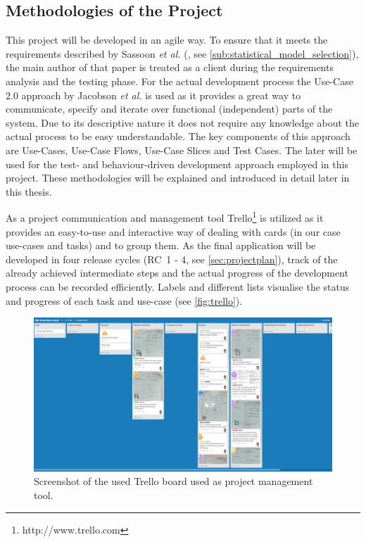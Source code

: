 \subsection{Methodologies of the Project}
\label{sub:methodologies}
This project will be developed in an agile way. To ensure that it meets the requirements described by Sassoon \textit{et al.} (\cite{sassoon2014}, see \autoref{sub:statistical_model_selection}), the main author of that paper is treated as a client during the requirements analysis and the testing phase. For the actual development process the Use-Case 2.0 approach by Jacobson \textit{et al.} \cite{jacobson2011usecase} is used as it provides a great way to communicate, specify and iterate over functional (independent) parts of the system. Due to its descriptive nature it does not require any knowledge about the actual process to be easy understandable. The key components of this approach are Use-Cases, Use-Case Flows, Use-Case Slices and Test Cases. The later will be used for the test- and behaviour-driven development approach employed in this project. These methodologies will be explained and introduced in detail later in this thesis. 

As a project communication and management tool Trello\footnote{http://www.trello.com} is utilized as it provides an easy-to-use and interactive way of dealing with cards (in our case use-cases and tasks) and to group them. As the final application will be developed in four release cycles (RC~1 - 4, see \autoref{sec:projectplan}), track of the already achieved intermediate steps and the actual progress of the development process can be recorded efficiently. Labels and different lists visualise the status and progress of each task and use-case (see \autoref{fig:trello}).


\begin{figure}[h]
\centering
	\includegraphics[page=1,width=\textwidth]{figures/trello}
\caption{Screenshot of the used Trello board used as project management tool.}
\label{fig:trello}
\end{figure}


